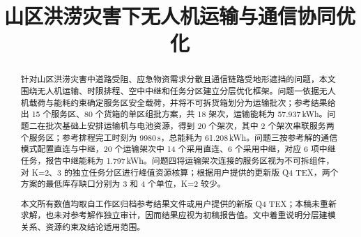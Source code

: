 \documentclass{gmcmthesis}
\title{山区洪涝灾害下无人机运输与通信协同优化}
\begin{document}
\maketitle
\begin{abstract}
针对山区洪涝灾害中道路受阻、应急物资需求分散且通信链路受地形遮挡的问题，本文围绕无人机运输、时限排程、空中中继和任务分区建立分层优化框架。问题一依据无人机载荷与能耗约束确定服务区安全载荷，并将不可拆货箱划分为运输批次；参考结果给出 15 个服务区、80 个货箱的单区组批方案，共 18 架次，运输能耗为 57.937\,kWh。问题二在批次基础上安排运输机与电池资源，得到 20 个架次，其中 2 个架次串联服务两个服务区；参考排程完工时刻为 9980\,s，总能耗为 61.208\,kWh。问题三按参考解的通信模式配置直连与中继，20 个运输架次中 14 个采用直连、6 个采用中继，对应 6 项中继任务，报告中继能耗为 1.797\,kWh。问题四将运输架次连接的服务区视为不可拆组件，对 K=2、3 的独立任务分区进行峰值资源核算；根据用户提供的更新版 Q4 TEX，两个方案的最低库存缺口分别为 3 和 4 个单位，K=2 较少。

本文所有数值均取自工作区归档参考结果文件或用户提供的新版 Q4 TEX；本稿未重新求解，也未对参考解作独立审计，因而结果应视为初稿报告值。文中着重说明分层建模关系、资源约束及结论适用范围。
\end{abstract}
\pagestyle{plain}










\begin{appendices}

\end{appendices}
\end{document}
